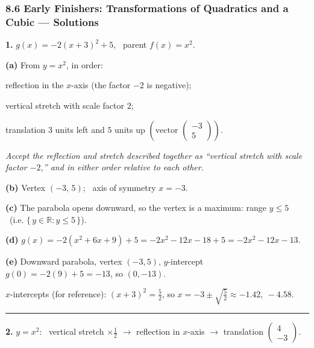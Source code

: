 \documentclass[12pt, twoside]{article}
\begin{document}
\subsubsection*{8.6 Early Finishers: Transformations of Quadratics and a Cubic --- Solutions}

\medskip

\noindent\textbf{1.} $\displaystyle g(x)=-2(x+3)^2+5$, \ parent $f(x)=x^2$.

\medskip

\textbf{(a)} From $y=x^2$, in order:

\quad reflection in the $x$-axis (the factor $-2$ is negative);

\quad vertical stretch with scale factor $2$;

\quad translation $3$ units left and $5$ units up
$\left(\text{vector } \left(\begin{smallmatrix}-3\\5\end{smallmatrix}\right)\right)$.

\emph{Accept the reflection and stretch described together as ``vertical
stretch with scale factor $-2$,'' and in either order relative to each other.}

\medskip

\textbf{(b)} Vertex $(-3,\,5)$; \ axis of symmetry $x=-3$.

\medskip

\textbf{(c)} The parabola opens downward, so the vertex is a maximum:
range $y\le 5$ \ (i.e. $\{\,y\in\mathbb{R} : y\le 5\,\}$).

\medskip

\textbf{(d)} $g(x)=-2(x^2+6x+9)+5=-2x^2-12x-18+5=-2x^2-12x-13$.

\medskip

\textbf{(e)} Downward parabola, vertex $(-3,5)$, $y$-intercept
$g(0)=-2(9)+5=-13$, so $(0,-13)$.

$x$-intercepts (for reference): $(x+3)^2=\tfrac{5}{2}$, so
$x=-3\pm\sqrt{\tfrac{5}{2}}\approx -1.42,\ -4.58$.

\bigskip\hrule\bigskip

\noindent\textbf{2.} $y=x^2$: \ vertical stretch $\times\tfrac{1}{2}$
$\rightarrow$ reflection in $x$-axis $\rightarrow$ translation
$\left(\begin{smallmatrix}4\\-3\end{smallmatrix}\right)$.
\end{document}
